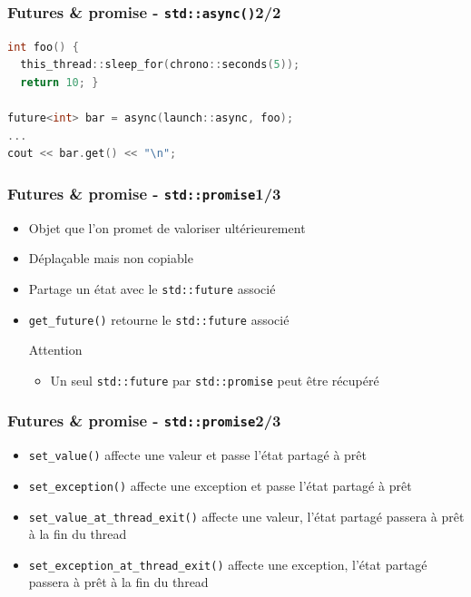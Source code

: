 \documentclass[C++.tex]{subfiles}
\begin{document}
\begin{frame}[fragile]
	\frametitle{Futures \& promise - \lstinline|std::async()|\titlehfill{}2/2}
	\begin{lstlisting}[language=C++]
int foo() {
  this_thread::sleep_for(chrono::seconds(5));
  return 10; }

future<int> bar = async(launch::async, foo);
...
cout << bar.get() << "\n";\end{lstlisting}
\end{frame}

\begin{frame}[fragile]
	\frametitle{Futures \& promise - \lstinline|std::promise|\titlehfill{}1/3}
	\begin{itemize}
		\item Objet que l'on promet de valoriser ultérieurement
		\item Déplaçable mais non copiable
		\item Partage un état avec le \lstinline|std::future| associé
		\item \lstinline|get_future()| retourne le \lstinline|std::future| associé

		\begin{alertblock}{Attention}
			\begin{itemize}
				\item Un seul \lstinline|std::future| par \lstinline|std::promise| peut être récupéré
			\end{itemize}
		\end{alertblock}
	\end{itemize}
\end{frame}

\begin{frame}[fragile]
	\frametitle{Futures \& promise - \lstinline|std::promise|\titlehfill{}2/3}
	\begin{itemize}
		\item \lstinline|set_value()| affecte une valeur et passe l'état partagé à prêt
		\item \lstinline|set_exception()| affecte une exception et passe l'état partagé à prêt
		\item \lstinline|set_value_at_thread_exit()| affecte une valeur, l'état partagé passera à prêt à la fin du thread
		\item \lstinline|set_exception_at_thread_exit()| affecte une exception, l'état partagé passera à prêt à la fin du thread
	\end{itemize}
\end{frame}
\end{document}

